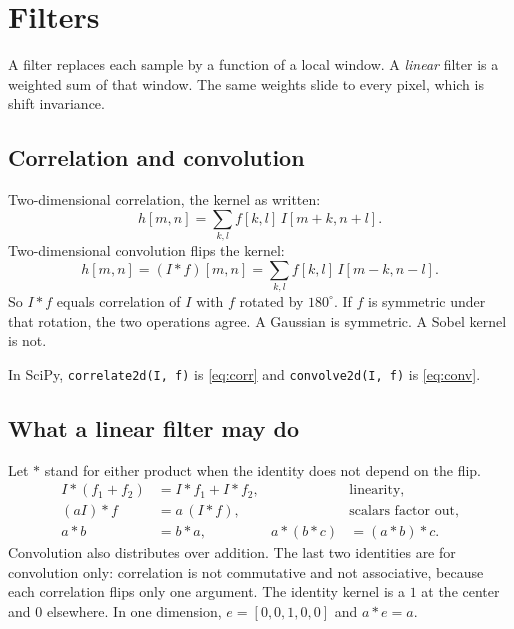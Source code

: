 \documentclass[11pt]{article}
\newcommand{\img}{I}
\newcommand{\filt}{f}
\newcommand{\outp}{h}
\newcommand{\conv}{\ast}
\begin{document}
\section{Filters}

A filter replaces each sample by a function of a local window. A \emph{linear} filter is a weighted sum of that window. The same weights slide to every pixel, which is shift invariance.

\subsection{Correlation and convolution}

Two-dimensional correlation, the kernel as written:
\begin{equation}
\outp[m,n]
=
\sum_{k,l} \filt[k,l]\,\img[m+k,n+l].
\label{eq:corr}
\end{equation}
Two-dimensional convolution flips the kernel:
\begin{equation}
\outp[m,n]
=
(\img\conv\filt)[m,n]
=
\sum_{k,l} \filt[k,l]\,\img[m-k,n-l].
\label{eq:conv}
\end{equation}
So $\img\conv\filt$ equals correlation of $\img$ with $\filt$ rotated by $180^\circ$. If $\filt$ is symmetric under that rotation, the two operations agree. A Gaussian is symmetric. A Sobel kernel is not.

In SciPy, \texttt{correlate2d(I, f)} is \eqref{eq:corr} and \texttt{convolve2d(I, f)} is \eqref{eq:conv}.

\subsection{What a linear filter may do}

Let $\ast$ stand for either product when the identity does not depend on the flip.
\begin{align}
\img\ast(\filt_1+\filt_2)
&=
\img\ast\filt_1+\img\ast\filt_2,
&
&\text{linearity,} \\
(a\img)\ast\filt
&=
a\,(\img\ast\filt),
&
&\text{scalars factor out,} \\
a\conv b &= b\conv a,
&
a\conv(b\conv c)&=(a\conv b)\conv c.
\end{align}
Convolution also distributes over addition. The last two identities are for convolution only: correlation is not commutative and not associative, because each correlation flips only one argument. The identity kernel is a $1$ at the center and $0$ elsewhere. In one dimension, $e=[0,0,1,0,0]$ and $a\conv e=a$.
\end{document}
